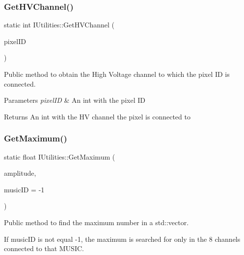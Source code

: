 \subsubsection{\texorpdfstring{Get\+H\+V\+Channel()}{GetHVChannel()}}
{\footnotesize\ttfamily static int I\+Utilities\+::\+Get\+H\+V\+Channel (\begin{DoxyParamCaption}\item[{int}]{pixel\+ID }\end{DoxyParamCaption})\hspace{0.3cm}{\ttfamily [static]}}



Public method to obtain the High Voltage channel to which the pixel ID is connected. 


\begin{DoxyParams}{Parameters}
{\em pixel\+ID} & An int with the pixel ID\\
\hline
\end{DoxyParams}
\begin{DoxyReturn}{Returns}
An int with the HV channel the pixel is connected to 
\end{DoxyReturn}
\mbox{\label{classIUtilities_a13f7d8d17e744480f85c2b2e789e544e}} 
\subsubsection{\texorpdfstring{Get\+Maximum()}{GetMaximum()}\hspace{0.1cm}{\footnotesize\ttfamily [1/2]}}
{\footnotesize\ttfamily static float I\+Utilities\+::\+Get\+Maximum (\begin{DoxyParamCaption}\item[{std\+::vector$<$ float $>$}]{amplitude,  }\item[{int}]{music\+ID = {\ttfamily -\/1} }\end{DoxyParamCaption})\hspace{0.3cm}{\ttfamily [static]}}



Public method to find the maximum number in a std\+::vector. 

If music\+ID is not equal -\/1, the maximum is searched for only in the 8 channels connected to that M\+U\+S\+IC.


